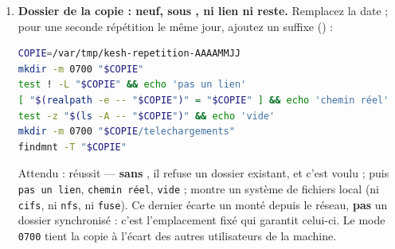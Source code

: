 \documentclass[a4paper,11pt,oneside]{article}
\begin{document}
\begin{enumerate}
\begin{lstlisting}[language=bash]
\end{lstlisting}
    Attendu : \texttt{démon joignable} (un démon injoignable « ne rend rien » aussi, avec un code non nul), puis \textbf{rien} pour les cinq autres lignes. Un volume resté d'une répétition non détruite garderait son ancien mot de passe : c'est le cas \emph{Reste d'une répétition antérieure}, plus bas.
    \item \textbf{Dossier de la copie : neuf, sous , ni lien ni reste.} Remplacez la date ; pour une seconde répétition le même jour, ajoutez un suffixe () :
\begin{lstlisting}[language=bash]
COPIE=/var/tmp/kesh-repetition-AAAAMMJJ
mkdir -m 0700 "$COPIE"
test ! -L "$COPIE" && echo 'pas un lien'
[ "$(realpath -e -- "$COPIE")" = "$COPIE" ] && echo 'chemin réel'
test -z "$(ls -A -- "$COPIE")" && echo 'vide'
mkdir -m 0700 "$COPIE/telechargements"
findmnt -T "$COPIE"
\end{lstlisting}
    Attendu :  réussit --- \textbf{sans} , il refuse un dossier existant, et c'est voulu ; puis \texttt{pas un lien}, \texttt{chemin réel}, \texttt{vide} ;  montre un système de fichiers local (ni \texttt{cifs}, ni \texttt{nfs}, ni \texttt{fuse}). Ce dernier écarte un  monté depuis le réseau, \textbf{pas} un dossier synchronisé : c'est l'emplacement fixé qui garantit celui-ci. Le mode \texttt{0700} tient la copie à l'écart des autres utilisateurs de la machine.
\end{enumerate}
\end{document}
